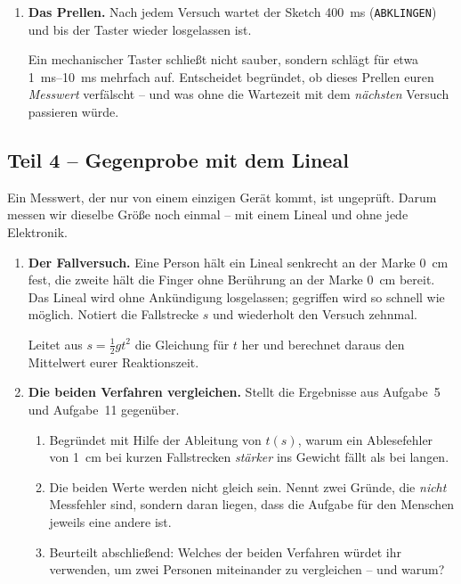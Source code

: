 \documentclass[a4paper,12pt]{scrartcl}
\begin{document}
\begin{enumerate}[leftmargin=2em, resume, itemsep=9pt, topsep=7pt]
\smallskip
Berechnet mit $s_{\bar{t}} = s/\sqrt{n}$ und eurem $s$, wie viele Versuche $n$ nötig wären, damit
der Mittelwert auf \SI{2}{\milli\second} genau ist. Beurteilt, ob diese Messreihe praktisch
durchführbar ist, und nennt die Annahme, die dabei stillschweigend gemacht wird (Stichwort:
Aufgabe~4).

\item \textbf{Das Prellen.} Nach jedem Versuch wartet der Sketch \SI{400}{\milli\second}
(\texttt{ABKLINGEN}) und bis der Taster wieder losgelassen ist.

\smallskip
Ein mechanischer Taster schließt nicht sauber, sondern schlägt für etwa
\SIrange{1}{10}{\milli\second} mehrfach auf. Entscheidet begründet, ob dieses Prellen euren
\emph{Messwert} verfälscht -- und was ohne die Wartezeit mit dem \emph{nächsten} Versuch passieren
würde.
\end{enumerate}

\subsection*{Teil 4 -- Gegenprobe mit dem Lineal}

\noindent Ein Messwert, der nur von einem einzigen Gerät kommt, ist ungeprüft. Darum messen wir
dieselbe Größe noch einmal -- mit einem Lineal und ohne jede Elektronik.

\begin{enumerate}[leftmargin=2em, resume, itemsep=9pt, topsep=7pt]
\item \textbf{Der Fallversuch.} Eine Person hält ein Lineal senkrecht an der Marke \SI{0}{\centi\meter}
fest, die zweite hält die Finger ohne Berührung an der Marke \SI{0}{\centi\meter} bereit. Das Lineal wird
ohne Ankündigung losgelassen; gegriffen wird so schnell wie möglich. Notiert die Fallstrecke $s$
und wiederholt den Versuch zehnmal.

\smallskip
Leitet aus $s=\frac{1}{2}g t^2$ die Gleichung für $t$ her und berechnet daraus den Mittelwert
eurer Reaktionszeit.

\item \textbf{Die beiden Verfahren vergleichen.} Stellt die Ergebnisse aus Aufgabe~5 und
Aufgabe~11 gegenüber.
  \begin{enumerate}[label=(\alph*), leftmargin=2em, itemsep=6pt, topsep=5pt]
  \item Begründet mit Hilfe der Ableitung von $t(s)$, warum ein Ablesefehler von \SI{1}{\centi\meter} bei
        kurzen Fallstrecken \emph{stärker} ins Gewicht fällt als bei langen.
  \item Die beiden Werte werden nicht gleich sein. Nennt zwei Gründe, die \emph{nicht}
        Messfehler sind, sondern daran liegen, dass die Aufgabe für den Menschen jeweils eine
        andere ist.
  \item Beurteilt abschließend: Welches der beiden Verfahren würdet ihr verwenden, um zwei
        Personen miteinander zu vergleichen -- und warum?
  \end{enumerate}
\end{enumerate}
\end{document}
